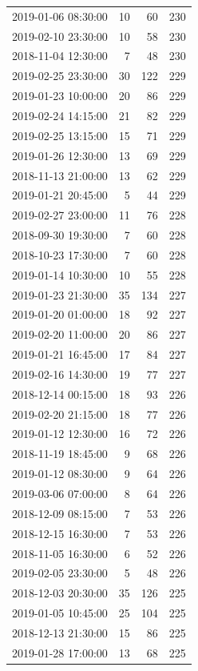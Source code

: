 \begin{tabular}{lrrr}
2019-01-06 08:30:00 & 10 & 60 & 230 \\
2019-02-10 23:30:00 & 10 & 58 & 230 \\
2018-11-04 12:30:00 & 7 & 48 & 230 \\
2019-02-25 23:30:00 & 30 & 122 & 229 \\
2019-01-23 10:00:00 & 20 & 86 & 229 \\
2019-02-24 14:15:00 & 21 & 82 & 229 \\
2019-02-25 13:15:00 & 15 & 71 & 229 \\
2019-01-26 12:30:00 & 13 & 69 & 229 \\
2018-11-13 21:00:00 & 13 & 62 & 229 \\
2019-01-21 20:45:00 & 5 & 44 & 229 \\
2019-02-27 23:00:00 & 11 & 76 & 228 \\
2018-09-30 19:30:00 & 7 & 60 & 228 \\
2018-10-23 17:30:00 & 7 & 60 & 228 \\
2019-01-14 10:30:00 & 10 & 55 & 228 \\
2019-01-23 21:30:00 & 35 & 134 & 227 \\
2019-01-20 01:00:00 & 18 & 92 & 227 \\
2019-02-20 11:00:00 & 20 & 86 & 227 \\
2019-01-21 16:45:00 & 17 & 84 & 227 \\
2019-02-16 14:30:00 & 19 & 77 & 227 \\
2018-12-14 00:15:00 & 18 & 93 & 226 \\
2019-02-20 21:15:00 & 18 & 77 & 226 \\
2019-01-12 12:30:00 & 16 & 72 & 226 \\
2018-11-19 18:45:00 & 9 & 68 & 226 \\
2019-01-12 08:30:00 & 9 & 64 & 226 \\
2019-03-06 07:00:00 & 8 & 64 & 226 \\
2018-12-09 08:15:00 & 7 & 53 & 226 \\
2018-12-15 16:30:00 & 7 & 53 & 226 \\
2018-11-05 16:30:00 & 6 & 52 & 226 \\
2019-02-05 23:30:00 & 5 & 48 & 226 \\
2018-12-03 20:30:00 & 35 & 126 & 225 \\
2019-01-05 10:45:00 & 25 & 104 & 225 \\
2018-12-13 21:30:00 & 15 & 86 & 225 \\
2019-01-28 17:00:00 & 13 & 68 & 225 \\

\end{tabular}
